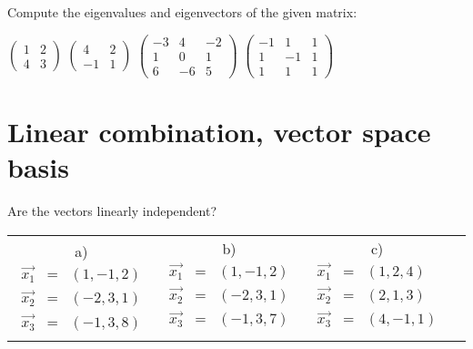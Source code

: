 \documentclass[a4paper,10pt]{book}
\newenvironment{tabbedenum}[1]
 {\NumTabs{#1}\inparaenum\let\latexitem\item
  \def\item{\def\item{\tab\latexitem}\latexitem}}
{\endinparaenum}
\begin{document}
\exercise \label{ex:mvlc2} Compute the eigenvalues and eigenvectors of the given matrix:

\begin{tabbedenum}{3}
\item $\begin{pmatrix} 1 & 2 \\ 4 & 3 \end{pmatrix}$
\item $\begin{pmatrix} 4 & 2 \\ -1 & 1 \end{pmatrix}$
\item $\begin{pmatrix} -3 & 4 & -2 \\ 1 & 0 & 1 \\ 6 & -6 & 5 \end{pmatrix}$
\item $\begin{pmatrix} -1 & 1 & 1 \\ 1 & -1 & 1 \\ 1 & 1 & 1 \end{pmatrix}$
\end{tabbedenum}

\section{Linear combination, vector space basis}

\exercise \label{ex:lkb1} Are the vectors linearly independent?

\begin{center}
\begin{tabular}{cccc}
a)  $ \begin{array}{rcl}
        \vec{x_1} &=& (1, -1, 2) \\
        \vec{x_2} &=& (-2, 3, 1) \\
        \vec{x_3} &=& (-1, 3, 8) 
      \end{array}
  $ &
b)  $ \begin{array}{rcl}
        \vec{x_1} &=& (1, -1, 2) \\
        \vec{x_2} &=& (-2, 3, 1) \\
        \vec{x_3} &=& (-1, 3, 7) \\
      \end{array}
  $ &  
c)  $ \begin{array}{rcl}
        \vec{x_1} &=& (1, 2, 4) \\
        \vec{x_2} &=& (2, 1, 3) \\
        \vec{x_3} &=& (4, -1, 1) \\
      \end{array}
  $ 
\end{tabular}
\end{center}
\end{document}
